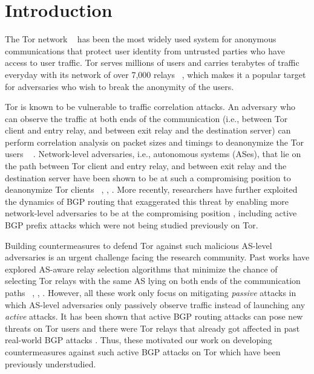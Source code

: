 \section{Introduction}

The Tor network ~\cite{dingledine2004tor} has been the most widely used system for anonymous communications that protect user identity from untrusted parties who have access to user traffic. Tor serves millions of users and carries terabytes of traffic everyday with its network of over 7,000 relays ~\cite{tormetrics}, which makes it a popular target for adversaries who wish to break the anonymity of the users. 

Tor is known to be vulnerable to traffic correlation attacks. An adversary who can observe the traffic at both ends of the communication (i.e., between Tor client and entry relay, and between exit relay and the destination server) can perform  correlation analysis on packet sizes and timings to deanonymize the Tor users ~\cite{shmatikov2006timing} \cite{syverson2001towards}. Network-level adversaries, i.e., autonomous systems (ASes), that lie on the path between Tor client and entry relay, and between exit relay and the destination server have been shown to be at such a compromising position to deanonymize Tor clients ~\cite{feamster2004location}, \cite{edman2009awareness}, \cite{johnson2013users}. More recently, researchers have further exploited the dynamics of BGP routing that exaggerated this threat by enabling more network-level adversaries to be at the compromising position \cite{sun2015raptor}, including active BGP prefix attacks which were not being studied previously on Tor. 

Building countermeasures to defend Tor against such malicious AS-level adversaries is an urgent challenge facing the research community. Past works have explored AS-aware relay selection algorithms that minimize the chance of selecting Tor relays with the same AS lying on both ends of the communication paths ~\cite{edman2009awareness}, \cite{akhoondi2012lastor}, \cite{starov2015measuring}. However, all these work only focus on mitigating \emph{passive} attacks in which AS-level adversaries only passively observe traffic instead of launching any \emph{active} attacks. It has been shown that active BGP routing attacks can pose new threats on Tor users and there were Tor relays that already got affected in past real-world BGP attacks \cite{sun2015raptor}. Thus, these motivated our work on developing countermeasures against such active BGP attacks on Tor which have been previously understudied. 


